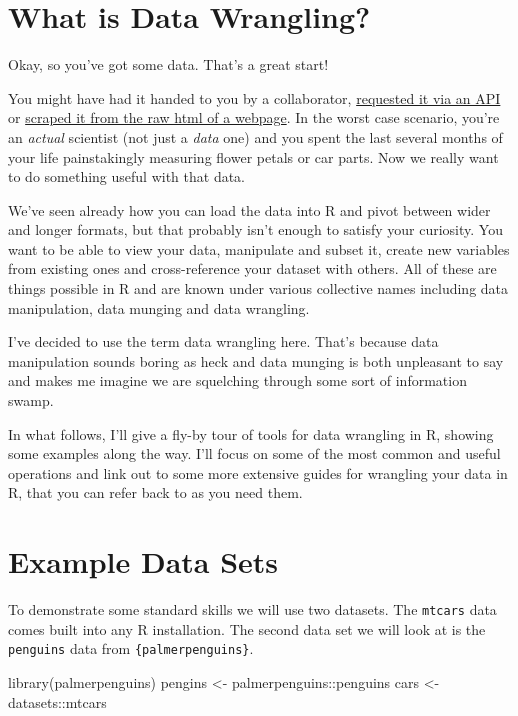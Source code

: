 \documentclass[
  12pt,
]{book}
\newenvironment{Shaded}{\begin{snugshade}}{\end{snugshade}}
\newcommand{\FunctionTok}[1]{\textcolor[rgb]{0.00,0.00,0.00}{#1}}
\newcommand{\NormalTok}[1]{#1}
\newcommand{\OtherTok}[1]{\textcolor[rgb]{0.56,0.35,0.01}{#1}}
\newcommand{\SpecialCharTok}[1]{\textcolor[rgb]{0.00,0.00,0.00}{#1}}
\begin{document}
\hypertarget{what-is-data-wrangling}{%
\section{What is Data Wrangling?}\label{what-is-data-wrangling}}

Okay, so you've got some data. That's a great start!

You might have had it handed to you by a collaborator, \protect\hyperlink{data-apis}{requested it via an API} or \protect\hyperlink{data-webscraping}{scraped it from the raw html of a webpage}. In the worst case scenario, you're an \emph{actual} scientist (not just a \emph{data} one) and you spent the last several months of your life painstakingly measuring flower petals or car parts. Now we really want to do something useful with that data.

We've seen already how you can load the data into R and pivot between wider and longer formats, but that probably isn't enough to satisfy your curiosity. You want to be able to view your data, manipulate and subset it, create new variables from existing ones and cross-reference your dataset with others. All of these are things possible in R and are known under various collective names including data manipulation, data munging and data wrangling.

I've decided to use the term data wrangling here. That's because data manipulation sounds boring as heck and data munging is both unpleasant to say and makes me imagine we are squelching through some sort of information swamp.

In what follows, I'll give a fly-by tour of tools for data wrangling in R, showing some examples along the way. I'll focus on some of the most common and useful operations and link out to some more extensive guides for wrangling your data in R, that you can refer back to as you need them.

\hypertarget{example-data-sets}{%
\section{Example Data Sets}\label{example-data-sets}}

To demonstrate some standard skills we will use two datasets. The \texttt{mtcars} data comes built into any R installation. The second data set we will look at is the \texttt{penguins} data from \texttt{\{palmerpenguins\}}.

\begin{Shaded}
\begin{Highlighting}[]
\FunctionTok{library}\NormalTok{(palmerpenguins)}
\NormalTok{pengins }\OtherTok{\textless{}{-}}\NormalTok{ palmerpenguins}\SpecialCharTok{::}\NormalTok{penguins}
\NormalTok{cars }\OtherTok{\textless{}{-}}\NormalTok{ datasets}\SpecialCharTok{::}\NormalTok{mtcars}
\end{Highlighting}
\end{Shaded}
\end{document}
